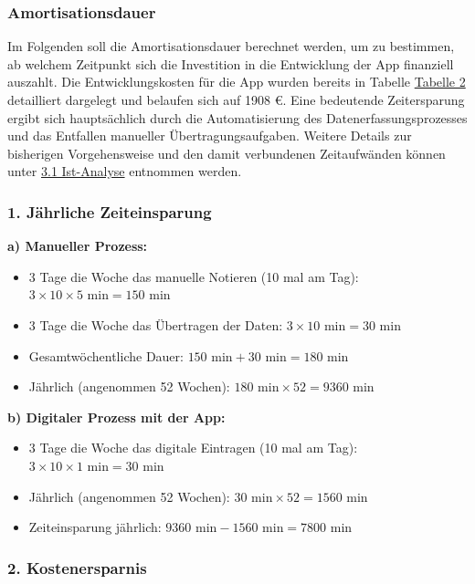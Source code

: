 \documentclass[a4paper,12pt]{article}
\begin{document}
\subsubsection{Amortisationsdauer}
Im Folgenden soll die Amortisationsdauer berechnet werden, um zu bestimmen, ab welchem Zeitpunkt sich die Investition in die Entwicklung der App finanziell auszahlt. Die Entwicklungskosten für die App wurden bereits in Tabelle \hyperlink{Kostenaufstellung}{Tabelle 2} detailliert dargelegt und belaufen sich auf 1908 €. Eine bedeutende Zeitersparung ergibt sich hauptsächlich durch die Automatisierung des Datenerfassungsprozesses und das Entfallen manueller Übertragungsaufgaben. Weitere Details zur bisherigen Vorgehensweise und den damit verbundenen Zeitaufwänden können unter  \hyperref[sec:Ist-Analyse]{3.1 Ist-Analyse} entnommen werden.

\subsubsection*{1. Jährliche Zeiteinsparung}

\textbf{a) Manueller Prozess:}
\begin{itemize}
    \item 3 Tage die Woche das manuelle Notieren (10 mal am Tag): $3 \times 10 \times 5 \text{ min} = 150 \text{ min}$
    \item 3 Tage die Woche das Übertragen der Daten: $3 \times 10 \text{ min} = 30 \text{ min}$
    \item Gesamtwöchentliche Dauer: $150 \text{ min} + 30 \text{ min} = 180 \text{ min}$
    \item Jährlich (angenommen 52 Wochen): $180 \text{ min} \times 52 = 9360 \text{ min}$
\end{itemize}
\textbf{b) Digitaler Prozess mit der App:}
\begin{itemize}
    \item 3 Tage die Woche das digitale Eintragen (10 mal am Tag): $3 \times 10 \times 1 \text{ min} = 30 \text{ min}$
    \item Jährlich (angenommen 52 Wochen): $30 \text{ min} \times 52 = 1560 \text{ min}$
    \item Zeiteinsparung jährlich: $9360 \text{ min} - 1560 \text{ min} = 7800 \text{ min}$
\end{itemize}

\subsubsection*{2. Kostenersparnis}
\end{document}
